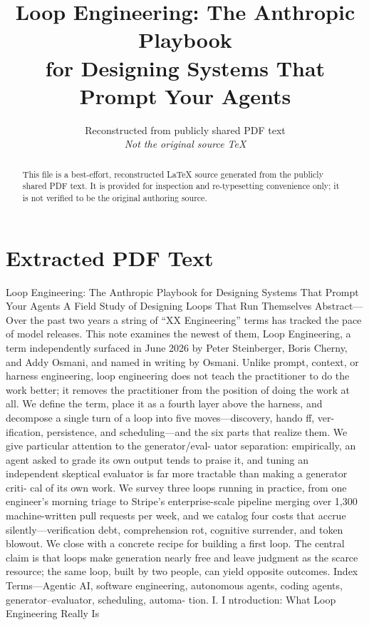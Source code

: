 \documentclass[conference]{IEEEtran}
\title{Loop Engineering: The Anthropic Playbook\\for Designing Systems That Prompt Your Agents}
\author{Reconstructed from publicly shared PDF text\\\textit{Not the original source TeX}}
\begin{document}
\maketitle
\begin{abstract}
This file is a best-effort, reconstructed LaTeX source generated from the publicly shared PDF text. It is provided for inspection and re-typesetting convenience only; it is not verified to be the original authoring source.
\end{abstract}
\section*{Extracted PDF Text}




Loop Engineering: The Anthropic Playbook
for Designing Systems That Prompt Your Agents
A Field Study of Designing Loops That Run Themselves
Abstract—Over the past two years a string of “XX Engineering”
terms has tracked the pace of model releases. This note examines
the newest of them, Loop Engineering, a term independently
surfaced in June 2026 by Peter Steinberger, Boris Cherny, and
Addy Osmani, and named in writing by Osmani. Unlike prompt,
context, or harness engineering, loop engineering does not teach
the practitioner to do the work better; it removes the practitioner
from the position of doing the work at all. We define the term,
place it as a fourth layer above the harness, and decompose a
single turn of a loop into five moves—discovery, hando ff, ver-
ification, persistence, and scheduling—and the six parts that
realize them. We give particular attention to the generator/eval-
uator separation: empirically, an agent asked to grade its own
output tends to praise it, and tuning an independent skeptical
evaluator is far more tractable than making a generator criti-
cal of its own work. We survey three loops running in practice,
from one engineer’s morning triage to Stripe’s enterprise-scale
pipeline merging over 1,300 machine-written pull requests per
week, and we catalog four costs that accrue silently—verification
debt, comprehension rot, cognitive surrender, and token blowout.
We close with a concrete recipe for building a first loop. The
central claim is that loops make generation nearly free and leave
judgment as the scarce resource; the same loop, built by two
people, can yield opposite outcomes.
Index Terms—Agentic AI, software engineering, autonomous
agents, coding agents, generator–evaluator, scheduling, automa-
tion.
I. I ntroduction: What Loop Engineering Really Is
\end{document}
